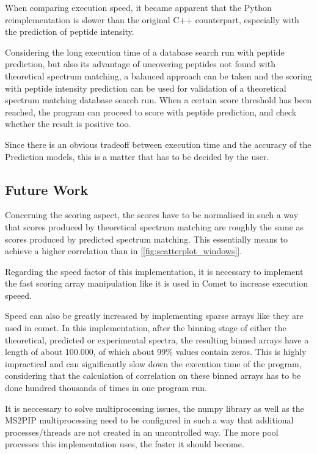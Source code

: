 \documentclass[11pt]{article}
\begin{document}
When comparing execution speed, it became apparent that the Python reimplementation is slower than the original C++ counterpart, especially with the prediction of peptide intensity. 

Considering the long execution time of a database search run with peptide prediction, but also its advantage of uncovering peptides not found with theoretical spectrum matching, a balanced approach can be taken and the scoring with peptide intensity prediction can be used for validation of a theoretical spectrum matching database search run. When a certain score threshold has been reached, the program can proceed to score with peptide prediction, and check whether the result is positive too.

Since there is an obvious tradeoff between execution time and the accuracy of the Prediction models, this is a matter that has to be decided by the user.

\subsection{Future Work}
Concerning the scoring aspect, the scores have to be normalised in such a way that scores produced by theoretical spectrum matching are roughly the same as scores produced by predicted spectrum matching. This essentially means to achieve a higher correlation than in [\cref{fig:scatterplot_windows}].

Regarding the speed factor of this implementation, it is necessary to implement the fast scoring array manipulation like it is used in Comet to increase execution speeed. 

Speed can also be greatly increased by implementing sparse arrays like they are used in comet. In this implementation, after the binning stage of either the theoretical, predicted or experimental spectra, the resulting binned arrays have a length of about 100.000, of which about 99\% values contain zeros. This is highly impractical and can significantly slow down the execution time of the program, considering that the calculation of correlation on these binned arrays has to be done hundred thousands of times in one program run.

It is neccessary to solve multiprocessing issues, the numpy library as well as the MS2PIP multiprocessing need to be configured in such a way that additional processes/threads are not created in an uncontrolled way. The more pool processes this implementation uses, the faster it should become.
\end{document}
